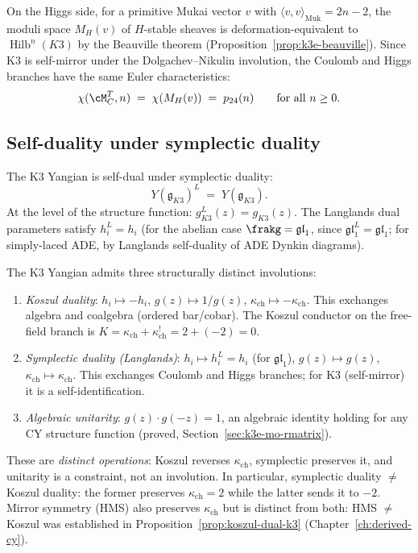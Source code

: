 On the Higgs side, for a primitive Mukai vector $v$ with $\langle v, v \rangle_{\mathrm{Muk}} = 2n-2$, the moduli space $M_H(v)$ of $H$-stable sheaves is deformation-equivalent to $\operatorname{Hilb}^n(K3)$ by the Beauville theorem (Proposition~\ref{prop:k3e-beauville}). Since K3 is self-mirror under the Dolgachev--Nikulin involution, the Coulomb and Higgs branches have the same Euler characteristics:
\begin{equation}
\label{eq:k3e-ch-euler-match}
 \chi(\cM_C^T, n) \;=\; \chi(M_H(v)) \;=\; p_{24}(n)
 \qquad\text{for all } n \geq 0.
\end{equation}

\subsection{Self-duality under symplectic duality}
\label{subsec:k3e-symplectic-selfduality}

\begin{conjecture}
\label{conj:k3e-yangian-selfdual}
\ClaimStatusConjectured
The K3 Yangian is self-dual under symplectic duality:
\[
 Y(\mathfrak{g}_{K3})^L \;=\; Y(\mathfrak{g}_{K3}).
\]
At the level of the structure function: $g_{K3}^L(z) = g_{K3}(z)$. The Langlands dual parameters satisfy $h_i^L = h_i$ (for the abelian case $\frakg = \mathfrak{gl}_1$, since $\mathfrak{gl}_1^L = \mathfrak{gl}_1$; for simply-laced ADE, by Langlands self-duality of ADE Dynkin diagrams).
\end{conjecture}

\begin{remark}
\label{rem:k3e-three-involutions}
The K3 Yangian admits three structurally distinct involutions:
\begin{enumerate}[label=\textup{(\roman*)}]
 \item \emph{Koszul duality}: $h_i \mapsto -h_i$, $g(z) \mapsto 1/g(z)$, $\kappa_{\mathrm{ch}} \mapsto -\kappa_{\mathrm{ch}}$. This exchanges algebra and coalgebra (ordered bar/cobar). The Koszul conductor on the free-field branch is $K = \kappa_{\mathrm{ch}} + \kappa_{\mathrm{ch}}^! = 2 + (-2) = 0$.
 \item \emph{Symplectic duality (Langlands)}: $h_i \mapsto h_i^L = h_i$ (for $\mathfrak{gl}_1$), $g(z) \mapsto g(z)$, $\kappa_{\mathrm{ch}} \mapsto \kappa_{\mathrm{ch}}$. This exchanges Coulomb and Higgs branches; for K3 (self-mirror) it is a self-identification.
 \item \emph{Algebraic unitarity}: $g(z) \cdot g(-z) = 1$, an algebraic identity holding for any CY structure function (proved, Section~\ref{sec:k3e-mo-rmatrix}).
\end{enumerate}
These are \emph{distinct operations}: Koszul reverses $\kappa_{\mathrm{ch}}$, symplectic preserves it, and unitarity is a constraint, not an involution. In particular, symplectic duality $\neq$ Koszul duality: the former preserves $\kappa_{\mathrm{ch}} = 2$ while the latter sends it to $-2$. Mirror symmetry (HMS) also preserves $\kappa_{\mathrm{ch}}$ but is distinct from both: HMS $\neq$ Koszul was established in Proposition~\ref{prop:koszul-dual-k3} (Chapter~\ref{ch:derived-cy}).
\end{remark}

